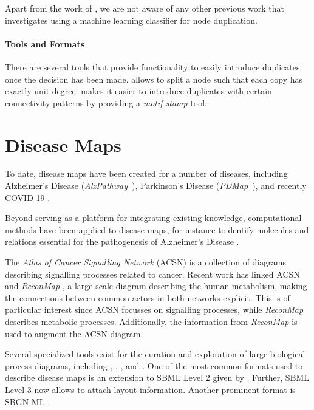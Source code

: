 \documentclass[
	fontsize=10pt, %
	twoside=false, %
	secnumdepth=1, %
  toc=indentunnumbered %
]{kaobook}
\begin{document}
Apart from the work of \citeauthor{nielsen_MachineLearningSupport_2019}, we are
not aware of any other previous work that investigates using a machine learning
classifier for node duplication.


\paragraph{Tools and Formats}
There are several tools that provide functionality to easily introduce
duplicates once the decision has been made. 
\cite{villeger_ArcadiaVisualizationTool_2010} allows to split a node such that
each copy has exactly unit degree. 
\cite{droste_OmixVisualizationTool_2013} makes it easier to introduce duplicates
with certain connectivity patterns by providing a \textit{motif stamp} tool.
%


\section{Disease Maps}
To date, disease maps have been created for a number of diseases, including
Alzheimer's Disease (\textit{AlzPathway}~\cite{ogishima_AlzPathwayUpdatedMap_2016}),
Parkinson's Disease (\textit{PDMap}~\cite{fujita_IntegratingPathwaysParkinson_2014}),
and recently \textsc{COVID-19}
\cite{ostaszewski_COVID19DiseaseMap_2020}.

Beyond serving as a platform for integrating existing knowledge, computational
methods have been applied to disease maps, for instance toidentify molecules and
relations essential for the pathogenesis of Alzheimer's Disease
\cite{mizuno_NetworkAnalysisComprehensive_2016}.

The \textit{Atlas of Cancer Signalling Network} (ACSN)
\cite{kuperstein_AtlasCancerSignalling_2015} is a collection of diagrams
describing signalling processes related to cancer. Recent work
\cite{sompairac_metabolic_2019} has linked ACSN and \textit{ReconMap}
\cite{noronha_ReconMapInteractiveVisualization_2017}, a
large-scale diagram describing the human metabolism, making
the connections between common actors in both networks explicit. This is of
particular interest since ACSN focusses on signalling processes, while
\textit{ReconMap} describes metabolic processes.
Additionally, the information from \textit{ReconMap} is used to augment the ACSN diagram.


Several specialized tools exist for the curation and exploration of large
biological process diagrams, including 
\cite{funahashi_CellDesignerVersatileModeling_2008}, 
\cite{gawron_MINERVAPlatformVisualization_2016}, 
\cite{kuperstein_NaviCellWebbasedEnvironment_2013}, 
\cite{shannon_cytoscape_2003} and 
\cite{rohn_VANTEDV2Framework_2012}.
%
One of the most common formats used to describe disease maps is an extension to SBML
Level 2 given by . Further, SBML Level 3 now allows to attach
layout information. Another prominent format is SBGN-ML.
\end{document}

